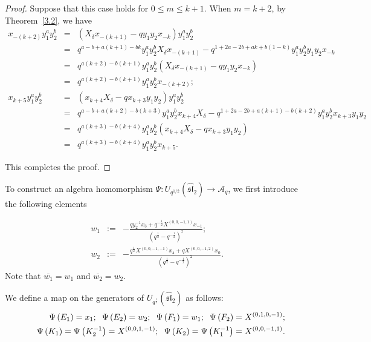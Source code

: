 \documentclass[reqno,11pt]{amsart}
\numberwithin{equation}{section}
\begin{document}
\begin{proof}
	Suppose that this case holds for  $0\le m\le k+1$. When $m=k+2$,	by Theorem~\ref{3.2}, we have
	\begin{eqnarray*}
		x_{-(k+2)}y_1^a y_2^b&=&\left(X_\delta x_{-(k+1)}-qy_1y_2x_{-k}\right)y_1^a y_2^b\\
		&=&q^{a-b+a(k+1)-bk}y_1^a y_2^bX_\delta x_{-(k+1)}-q^{1+2a-2b+ak+b(1-k)}y_1^a y_2^b y_1y_2x_{-k}\\
		&=&q^{a(k+2)-b(k+1)}y_1^a y_2^b\left(X_\delta x_{-(k+1)}-qy_1y_2x_{-k}\right)\\
		&=&q^{a(k+2)-b(k+1)}y_1^a y_2^b x_{-(k+2)};\\
		x_{k+5}y_1^a y_2^b&=&\left(x_{k+4}X_\delta-qx_{k+3}y_1y_2\right)y_1^a y_2^b\\
		&=&q^{a-b+a(k+2)-b(k+3)}y_1^a y_2^b x_{k+4}X_\delta-q^{1+2a-2b+a(k+1)-b(k+2)}y_1^a y_2^b x_{k+3}y_1y_2\\
		&=&q^{a(k+3)-b(k+4)}y_1^a y_2^b\left(x_{k+4}X_\delta-qx_{k+3}y_1y_2\right)\\
&=&q^{a(k+3)-b(k+4)}y_1^a y_2^b x_{k+5}.
	\end{eqnarray*}

	This completes the proof.
\end{proof}

To construct an algebra homomorphism
$\Psi: U_{q^{1/2}}(\widehat{\mathfrak{s l}}_2) \longrightarrow \mathcal{A}_q$, we first introduce the following elements

\begin{eqnarray}
	 w_1&:=&-\frac{q y_2^{-1} x_3+q^{-\frac{1}{2}} X^{(0,0,-1,1)}x_{-1}}{\left(q^{\frac{1}{2}}-q^{-\frac{1}{2}}\right)^2}; \label{(w1)}\\
	 w_2&:=&-\frac{q^{\frac{1}{2}} X^{(0,0,-1,-1)} x_4+q X^{(0,0,-1,2)}x_0}{\left(q^{\frac{1}{2}}-q^{-\frac{1}{2}}\right)^2} . \label{(w2)}
\end{eqnarray}
Note that $\overline{w_1}=w_1$ and $\overline{w_2}=w_2$.

We define a map on the generators of $U_{q^{\frac{1}{2}}}(\widehat{\mathfrak{s l}}_2)$  as follows:
\begin{eqnarray}
	 &&\Psi\left(E_1\right)=x_1;\hspace{0.2cm} \Psi\left(E_2\right)=w_2; \hspace{0.2cm}
	 \Psi\left(F_1\right)=w_1; \hspace{0.2cm} \Psi\left(F_2\right)=X^{(0,1,0,-1)}; \nonumber\\
	 &&\Psi\left(K_1\right)=\Psi\left(K_2^{-1}\right)=X^{(0,0,1,-1)}; \hspace{0.2cm}
	 \Psi\left(K_2\right)=\Psi\left(K_1^{-1}\right)=X^{(0,0,-1,1)} .\label{(3.6)}
\end{eqnarray}
\end{document}
